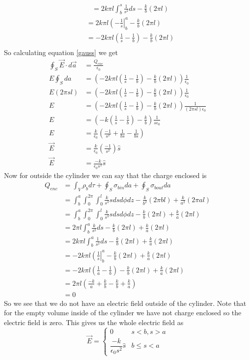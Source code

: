\documentclass[11pt]{article}
\numberwithin{equation}{section}
\newcommand{\vecE}{\vec{E}}
\begin{document}
\begin{enumerate}[(a)]
\begin{align*}
&= 2k\pi l\int_b^s\frac{1}{s^2}ds - \frac{k}{b}(2\pi l)
\end{align*}
\begin{align*}
&= 2k\pi l\left(-\frac{1}{s}\right|_b^a - \frac{k}{b}(2\pi l)\\
&= -2k\pi l\left(\frac{1}{s}-\frac{1}{b}\right) - \frac{k}{b}(2\pi l)\\
\end{align*}
So calculating equation \ref{gauss} we get
\begin{align*}
\oint_S \vecE\cdot d\vec{a} &= \frac{Q_{enc}}{\epsilon_0}\\
E\oint_S da &= \left(-2k\pi l\left(\frac{1}{s}-\frac{1}{b}\right) - \frac{k}{b}(2\pi l)\right)\frac{1}{\epsilon_0}\\
E(2\pi s l) &= \left(-2k\pi l\left(\frac{1}{s}-\frac{1}{b}\right) - \frac{k}{b}(2\pi l)\right)\frac{1}{\epsilon_0}\\
E &= \left(-2k\pi l\left(\frac{1}{s}-\frac{1}{b}\right) - \frac{k}{b}(2\pi l)\right)\frac{1}{(2\pi s l)\epsilon_0}\\
E &= \left(-k\left(\frac{1}{s}-\frac{1}{b}\right) - \frac{k}{b}\right)\frac{1}{s\epsilon_0}\\
E &= \frac{k}{\epsilon_0}\left(\frac{-1}{s^2}+\frac{1}{bs} - \frac{1}{bs}\right)\\
\vecE &= \frac{k}{\epsilon_0}\left(\frac{-1}{s^2}\right)\hat{s}\\
\vecE &= \frac{-k}{\epsilon_0s^2}\hat{s}
\end{align*}
Now for outside the cylinder we can say that the charge enclosed is
\begin{align*}
Q_{enc} &= \int_V\rho_bd\tau + \oint_S\sigma_{bin}da + \oint_S\sigma_{bout}da\\
&= \int_b^a\int_0^{2\pi}\int_0^l\frac{k}{s^3}sdsd\phi dz - \frac{k}{b^2}(2\pi bl)+\frac{k}{a^2}(2\pi al)\\
&= \int_b^a\int_0^{2\pi}\int_0^l\frac{k}{s^3}sdsd\phi dz - \frac{k}{b}(2\pi l)+\frac{k}{a}(2\pi l)\\
&= 2\pi l\int_b^a\frac{k}{s^2}ds - \frac{k}{b}(2\pi l)+\frac{k}{a}(2\pi l)\\
&= 2k\pi l\int_b^a\frac{1}{s^2}ds - \frac{k}{b}(2\pi l)+\frac{k}{a}(2\pi l)\\
&= -2k\pi l\left(\frac{1}{s}\right|_b^a - \frac{k}{b}(2\pi l)+\frac{k}{a}(2\pi l)\\
&= -2k\pi l\left(\frac{1}{a}-\frac{1}{b}\right) - \frac{k}{b}(2\pi l)+\frac{k}{a}(2\pi l)\\
&= 2\pi l\left(\frac{-k}{a}+\frac{k}{b} - \frac{k}{b}+\frac{k}{a}\right)\\
&= 0
\end{align*}
So we see that we do not have an electric field outside of the cylinder.
Note that for the empty volume inside of the cylinder we have not charge enclosed so the electric field is zero. This gives us the whole electric field as
$$\vecE = \left\{\begin{array}{lc}
		0	&s<b, s>a\\
	\dfrac{-k}{\epsilon_0s^2}\hat{s}	&b\le s<a
		\end{array}\right.$$


\end{enumerate}
\end{document}
